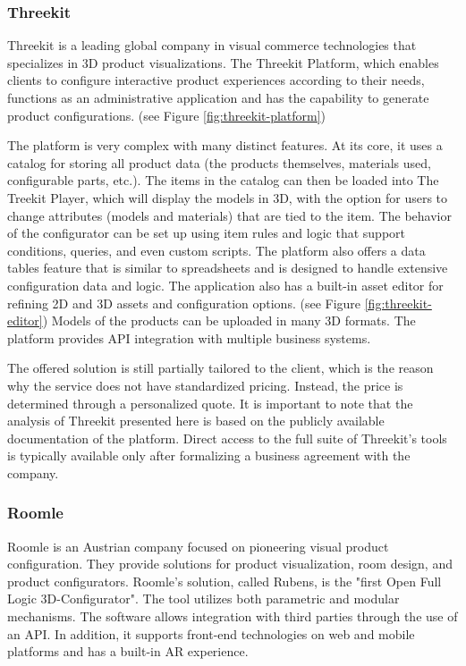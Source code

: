 \subsubsection{Threekit}

Threekit is a leading global company in visual commerce technologies that specializes in 3D product visualizations. The Threekit Platform, which enables clients to configure interactive product experiences according to their needs, functions as an administrative application and has the capability to generate product configurations. (see Figure \ref{fig:threekit-platform}) \cite{ThreeKitAboutUs} \cite{ThreeKitPlatform}

The platform is very complex with many distinct features. At its core, it uses a catalog for storing all product data (the products themselves, materials used, configurable parts, etc.). The items in the catalog can then be loaded into The Treekit Player, which will display the models in 3D, with the option for users to change attributes (models and materials) that are tied to the item. The behavior of the configurator can be set up using item rules and logic that support conditions, queries, and even custom scripts. The platform also offers a data tables feature that is similar to spreadsheets and is designed to handle extensive configuration data and logic. The application also has a built-in asset editor for refining 2D and 3D assets and configuration options. (see Figure \ref{fig:threekit-editor}) Models of the products can be uploaded in many 3D formats. The platform provides API integration with multiple business systems. \cite{ThreeKitPlatformDocumentation}

The offered solution is still partially tailored to the client, which is the reason why the service does not have standardized pricing. Instead, the price is determined through a personalized quote. It is important to note that the analysis of Threekit presented here is based on the publicly available documentation of the platform. Direct access to the full suite of Threekit's tools is typically available only after formalizing a business agreement with the company.


\subsubsection{Roomle}

Roomle is an Austrian company focused on pioneering visual product configuration. They provide solutions for product visualization, room design, and product configurators. Roomle's solution, called Rubens, is the "first Open Full Logic 3D-Configurator". The tool utilizes both parametric and modular mechanisms. The software allows integration with third parties through the use of an API. In addition, it supports front-end technologies on web and mobile platforms and has a built-in AR experience. \cite{RoomleAbout}

